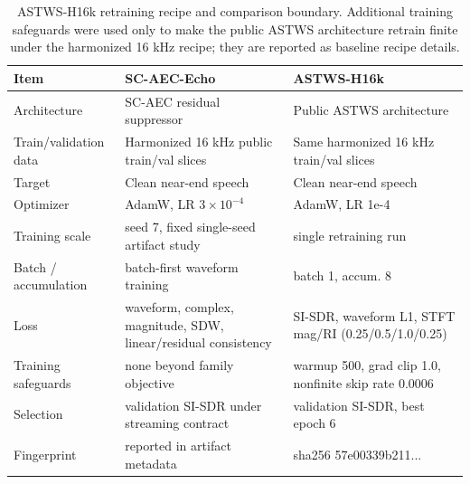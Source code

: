\begin{table}[t]
\caption{ASTWS-H16k retraining recipe and comparison boundary. Additional training safeguards were used only to make the public ASTWS architecture retrain finite under the harmonized 16 kHz recipe; they are reported as baseline recipe details.}
\label{tab:astws-recipe}
\centering
\small
\begin{tabular}{p{}p{}p{}}
\hline
Item & SC-AEC-Echo & ASTWS-H16k \\
\hline
Architecture & SC-AEC residual suppressor & Public ASTWS architecture \\
Train/validation data & Harmonized 16 kHz public train/val slices & Same harmonized 16 kHz train/val slices \\
Target & Clean near-end speech & Clean near-end speech \\
Optimizer & AdamW, LR $3\times10^{-4}$ & AdamW, LR 1e-4 \\
Training scale & seed 7, fixed single-seed artifact study & single retraining run \\
Batch / accumulation & batch-first waveform training & batch 1, accum. 8 \\
Loss & waveform, complex, magnitude, SDW, linear/residual consistency & SI-SDR, waveform L1, STFT mag/RI (0.25/0.5/1.0/0.25) \\
Training safeguards & none beyond family objective & warmup 500, grad clip 1.0, nonfinite skip rate 0.0006 \\
Selection & validation SI-SDR under streaming contract & validation SI-SDR, best epoch 6 \\
Fingerprint & reported in artifact metadata & sha256 57e00339b211... \\
\hline
\end{tabular}
\end{table}
